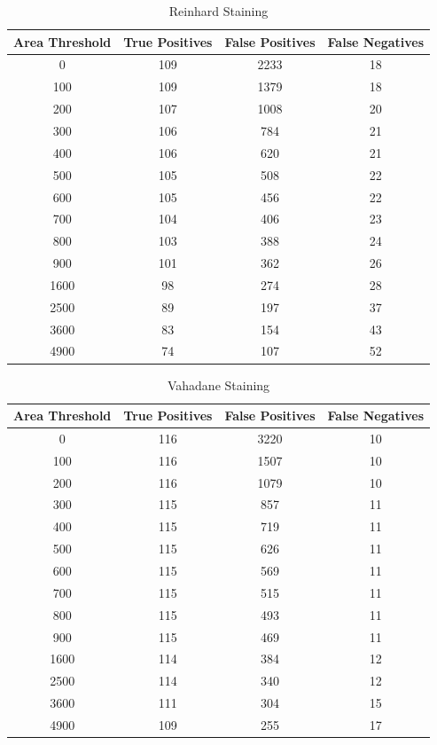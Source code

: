 \documentclass{nitk}
\begin{document}
\begin{table}[]
    \centering
    \begin{tabular}{c|c|c|c}
         Area Threshold & True Positives & False Positives & False Negatives  \\
         \hline
         0 & 109 & 2233 & 18 \\
100	& 109 &	1379 &	18 \\
200	& 107 &	1008 &	20 \\
300	& 106 &	784 &	21 \\
400	& 106 &	620	& 21 \\
500	& 105 &	508 &	22 \\
600	& 105 &	456 &	22 \\
700	& 104 &	406 &	23 \\
800	& 103 & 388	& 24 \\
900	& 101 &	362 &	26 \\
1600 &	98 &	274 &	28 \\
2500 &	89 &	197 &	37 \\
3600 &	83 &	154 &	43 \\
4900 &	74 &	107 & 	52 \\
    \end{tabular}
    \caption{Reinhard\cite{reinhard2001color} Staining}
    \label{tab:reinhard}
\end{table}

\begin{table}[]
    \centering
    \begin{tabular}{c|c|c|c}
         Area Threshold & True Positives & False Positives & False Negatives  \\
         \hline
         0 &	116 &	3220 &	10 \\
100	& 116 &	1507 &	10 \\
200	& 116 & 1079 &	10 \\
300	& 115 &	857 &	11 \\
400	& 115 &	719 &	11 \\
500	& 115 &	626 &	11 \\
600	& 115 &	569 &	11 \\
700	& 115 &	515	& 11 \\
800	& 115 &	493 &	11 \\
900	& 115 &	469 &	11 \\
1600 &	114 &	384 &	12 \\
2500 &	114 &	340 &	12 \\
3600 &	111 &	304 &	15 \\
4900 &	109 &	255 &	17 
    \end{tabular}
    \caption{Vahadane\cite{} Staining}
    \label{tab:vahadane}
\end{table}
\end{document}
